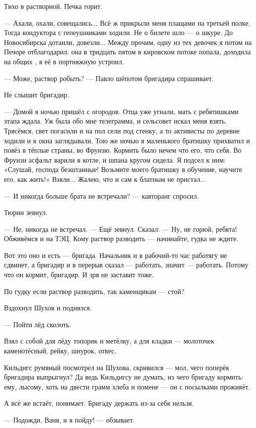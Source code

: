 Тихо в растворной. Печка горит.

--- Ахали, охали, совещались... Всё ж прикрыли меня плащами на третьей полке. Тогда кондуктора с
гепеушниками ходили. Не о билете шло --- о шкуре. До Новосибирска дотаили, довезли... Между
прочим, одну из тех девочек я потом на Печоре отблагодарил: она в тридцать пятом в кировском
потоке попала, доходила на общих , я её в портняжную устроил.

--- Може, раствор робыть? --- Павло шёпотом бригадира спрашивает.

Не слышит бригадир.

--- Домой я ночью пришёл с огородов. Отца уже угнали, мать с ребятишками этапа ждала. Уж была
обо мне телеграмма, и сельсовет искал меня взять. Трясёмся, свет погасили и на пол сели под
стенку, а то активисты по деревне ходили и в окна заглядывали. Тою же ночью я маленького
братишку прихватил и повёз в тёплые страны, во Фрунзю. Кормить было нечем что его, что себя.
Во Фрунзи асфальт варили в котле, и шпана кругом сидела. Я подсел к ним: «Слушай, господа
безштанные! Возьмите моего братишку в обучение, научите его, как жить!» Взяли... Жалею, что и
сам к блатным не пристал...

--- И никогда больше брата не встречали? --- кавторанг спросил.

Тюрин зевнул.

--- Не, никогда не встречал. --- Ещё зевнул. Сказал: --- Ну, не горюй, ребята! Обживёмся и на ТЭЦ.
Кому раствор разводить --- начинайте, гудка не ждите.

Вот это оно и есть --- бригада. Начальник и в рабочий-то час работягу не сдвинет, а бригадир и в
перерыв сказал --- работать, значит --- работать. Потому что он кормит, бригадир. И зря не
заставит тоже.

По гудку если раствор разводить, так каменщикам --- стой?

Вздохнул Шухов и поднялся.

--- Пойти лёд сколоть.

Взял с собой для лёду топорик и метёлку, а для кладки --- молоточек каменотёсный, рейку,
шнурок, отвес.

Кильдигс румяный посмотрел на Шухова, скривился --- мол, чего поперёк бригадира выпрыгнул? Да
ведь Кильдигсу не думать, из чего бригаду кормить: ему, лысому, хоть на двести грамм хлеба и
помене --- он с посылками проживёт.

А всё же встаёт, понимает. Бригаду держать из-за себя нельзя.

--- Подожди, Ваня, и я пойду! --- обзывает.

